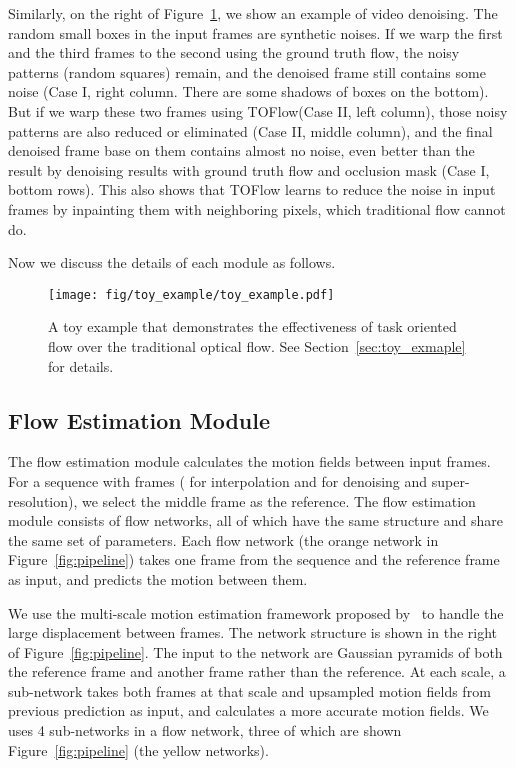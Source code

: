 \documentclass[twocolumn,natbib]{svjour3}          \smartqed  \usepackage{graphicx}
\newcommand{\sect}[1]{Section~\ref{#1}}
\newcommand{\fig}[1]{Figure~\ref{#1}}
\def\toflow{TOFlow\xspace}
\begin{document}
Similarly, on the right of \fig{fig:toy_example}, we show an example of video denoising. The random small boxes in the input frames are synthetic noises. If we warp the first and the third frames to the second using the ground truth flow, the noisy patterns (random squares) remain, and the denoised frame still contains some noise (Case I, right column. There are some shadows of boxes on the bottom). But if we warp these two frames using \toflow (Case II, left column), those noisy patterns are also reduced or eliminated (Case II, middle column), and the final denoised frame base on them contains almost no noise, even better than the result by denoising results with ground truth flow and occlusion mask (Case I, bottom rows).  This also shows that \toflow learns to reduce the noise in input frames by inpainting them with neighboring pixels, which traditional flow cannot do.

Now we discuss the details of each module as follows. 

\begin{figure}[t]
    \centering
    \texttt{[image: fig/toy\_example/toy\_example.pdf]}
    \caption{A toy example that demonstrates the effectiveness of task oriented flow over the traditional optical flow. See \sect{sec:toy_exmaple} for details. 
    }
    \label{fig:toy_example}
\end{figure}

 
\subsection{Flow Estimation Module}
\label{sect:flow_net}

The flow estimation module calculates the motion fields between input frames. For a sequence with  frames ( for interpolation and  for denoising and super-resolution), we select the middle frame as the reference. The flow estimation module consists of  flow networks, all of which have the same structure and share the same set of parameters. Each flow network (the orange network in Figure~\ref{fig:pipeline}) takes one frame from the sequence and the reference frame as input, and predicts the motion between them.

We use the multi-scale motion estimation framework proposed by~\cite{Ranjan2017Optical} to handle the large displacement between frames. The network structure is shown in the right of Figure~\ref{fig:pipeline}. The input to the network are Gaussian pyramids of both the reference frame and another frame rather than the reference. At each scale, a sub-network takes both frames at that scale and upsampled motion fields from previous prediction as input, and calculates a more accurate motion fields. We uses 4 sub-networks in a flow network, three of which are shown Figure~\ref{fig:pipeline} (the yellow networks). 
\end{document}
